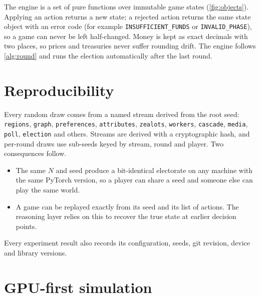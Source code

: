 \documentclass[11pt,a4paper,oneside]{report}
\newcommand{\code}[1]{\texttt{#1}}
\begin{document}
The engine is a set of pure functions over immutable game states (\cref{fig:objects}). Applying an action
returns a new state; a rejected action returns the same state object with an error code (for example
\code{INSUFFICIENT\_FUNDS} or \code{INVALID\_PHASE}), so a game can never be left half-changed. Money is
kept as exact decimals with two places, so prices and treasuries never suffer rounding drift. The engine
follows \cref{alg:round} and runs the election automatically after the last round.

\section{Reproducibility}

Every random draw comes from a named stream derived from the root seed: \code{regions}, \code{graph},
\code{preferences}, \code{attributes}, \code{zealots}, \code{workers}, \code{cascade}, \code{media},
\code{poll}, \code{election} and others. Streams are derived with a cryptographic hash, and per-round draws
use sub-seeds keyed by stream, round and player. Two consequences follow.
\begin{itemize}
  \item The same $N$ and seed produce a bit-identical electorate on any machine with the same PyTorch
        version, so a player can share a seed and someone else can play the same world.
  \item A game can be replayed exactly from its seed and its list of actions. The reasoning layer relies on
        this to recover the true state at earlier decision points.
\end{itemize}
Every experiment result also records its configuration, seeds, git revision, device and library versions.

\section{GPU-first simulation}
\end{document}
